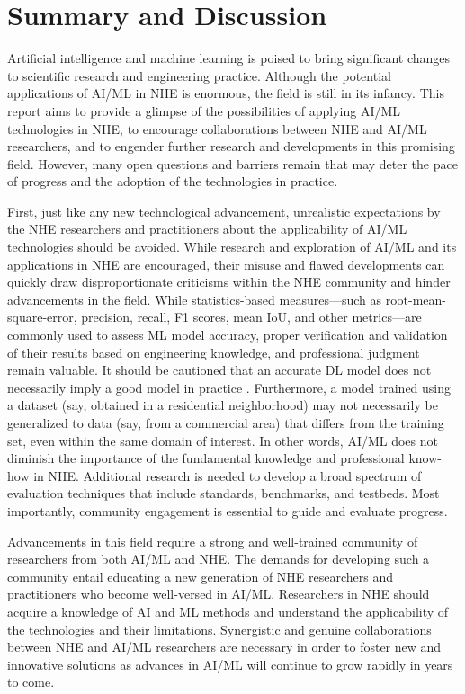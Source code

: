 \section{Summary and Discussion}
\label{sec:ai_summary}

Artificial intelligence and machine learning is poised to bring significant changes to scientific research and engineering practice. Although the potential applications of AI/ML in NHE is enormous, the field is still in its infancy. This report aims to provide a glimpse of the possibilities of applying AI/ML technologies in NHE, to encourage collaborations between NHE and AI/ML researchers, and to engender further research and developments in this promising field. However, many open questions and barriers remain that may deter the pace of progress and the adoption of the technologies in practice. 

First, just like any new technological advancement, unrealistic expectations by the NHE researchers and practitioners about the applicability of AI/ML technologies should be avoided. While research and exploration of AI/ML and its applications in NHE are encouraged, their misuse and flawed developments can quickly draw disproportionate criticisms within the NHE community and hinder advancements in the field. While statistics-based measures---such as root-mean-square-error, precision, recall, F1 scores, mean IoU, and other metrics---are commonly used to assess ML model accuracy, proper verification and validation of their results based on engineering knowledge, and professional judgment remain valuable. It should be cautioned that an accurate DL model does not necessarily imply a good model in practice \citep{mignan2019forecasting}. Furthermore, a model trained using a dataset (say, obtained in a residential neighborhood) may not necessarily be generalized to data (say, from a commercial area) that differs from the training set, even within the same domain of interest. In other words, AI/ML does not diminish the importance of the fundamental knowledge and professional know-how in NHE. Additional research is needed to develop a broad spectrum of evaluation techniques that include standards, benchmarks, and testbeds. Most importantly, community engagement is essential to guide and evaluate progress. 

Advancements in this field require a strong and well-trained community of researchers from both AI/ML and NHE. The demands for developing such a community entail educating a new generation of NHE researchers and practitioners who become well-versed in AI/ML. Researchers in NHE should acquire a knowledge of AI and ML methods and understand the applicability of the technologies and their limitations. Synergistic and genuine collaborations between NHE and AI/ML researchers are necessary in order to foster new and innovative solutions as advances in AI/ML will continue to grow rapidly in years to come. 

